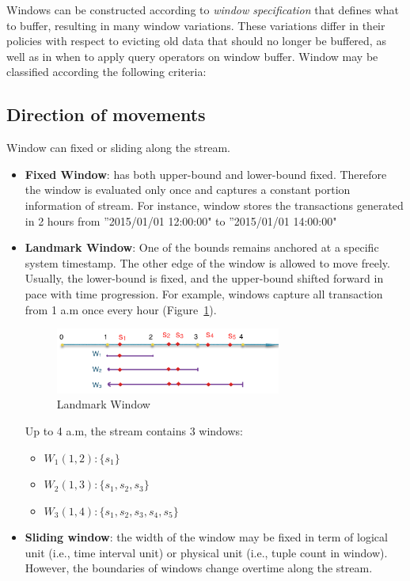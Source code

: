 Windows can be constructed according to \textit{window specification} that defines what to buffer, resulting in many window variations. These variations differ in their policies with respect to evicting old data that should no longer be buffered, as well as in when to apply query operators on window buffer. Window may be classified according the following criteria:

\subsection{Direction of movements}
Window can fixed or sliding along the stream.
\begin{itemize}

\item \textbf{Fixed Window}:  has both upper-bound and lower-bound fixed. Therefore the window is evaluated only once and captures a constant portion information of stream. For instance, window stores the transactions generated in 2 hours from ''2015/01/01 12:00:00" to ''2015/01/01 14:00:00"

\item \textbf{Landmark Window}: One of the bounds remains  anchored at a specific system timestamp. The other edge of the window is allowed to move freely. Usually, the lower-bound is fixed, and the upper-bound shifted forward in pace with time progression.
For example, windows capture all transaction from 1 a.m once every hour (Figure~\ref{fig:landMarkWin}).

\begin{figure}[htbp!] 
\centering    
\includegraphics[width=0.7\textwidth]{landMarkWin}
\caption{Landmark Window}
\label{fig:landMarkWin}
\end{figure}

Up to 4 a.m, the stream contains 3 windows: 
\begin{itemize}
\item $W_1(1,2):\{s_1\}$ 
\item $W_2(1,3):\{s_1, s_2, s_3\}$ 
\item $W_3(1,4):\{s_1, s_2, s_3, s_4,s_5\}$ 
\end{itemize}

\item \textbf{Sliding window}: the width of the window may be fixed in term of logical unit (i.e., time interval unit) or physical unit (i.e., tuple count in window). However, the boundaries of windows change overtime along the stream.


\end{itemize}
